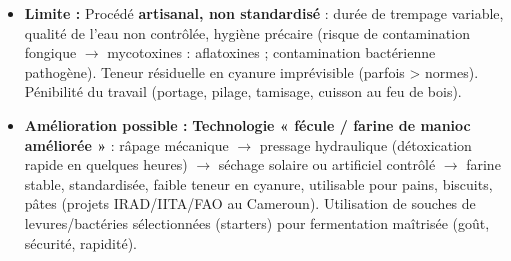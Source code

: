 \documentclass[11pt]{article}
\begin{document}
\begin{corrige}
\begin{enumerate}
\begin{itemize}
\item \textbf{Limite :} Procédé \textbf{artisanal, non standardisé} : durée de trempage variable, qualité de l'eau non contrôlée, hygiène précaire (risque de contamination fongique $\rightarrow$ mycotoxines : aflatoxines ; contamination bactérienne pathogène). Teneur résiduelle en cyanure imprévisible (parfois > normes). Pénibilité du travail (portage, pilage, tamisage, cuisson au feu de bois).
\item \textbf{Amélioration possible :} \textbf{Technologie « fécule / farine de manioc améliorée »} : râpage mécanique $\rightarrow$ pressage hydraulique (détoxication rapide en quelques heures) $\rightarrow$ séchage solaire ou artificiel contrôlé $\rightarrow$ farine stable, standardisée, faible teneur en cyanure, utilisable pour pains, biscuits, pâtes (projets IRAD/IITA/FAO au Cameroun). Utilisation de souches de levures/bactéries sélectionnées (starters) pour fermentation maîtrisée (goût, sécurité, rapidité).
\end{itemize}
\end{enumerate}
\end{corrige}
\end{document}
